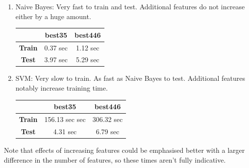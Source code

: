 \documentclass[twocolumn]{article}
\begin{document}
\begin{enumerate}

    \item Naive Bayes: Very fast to train and test. Additional features do not increase either by a huge amount.
    \begin{center}
    \begin{tabular}{ |c|c|c| } 
     \hline
      & \textbf{best35} & \textbf{best446} \\ 
     \hline 
     \textbf{Train} & 0.37 sec & 1.12 sec \\ 
     \textbf{Test} & 3.97 sec & 5.29 sec \\ 
     \hline
    \end{tabular}
    \end{center}
    
    \item SVM: Very slow to train. As fast as Naive Bayes to test. Additional features notably increase training time.

    \begin{center}
    \begin{tabular}{ |c|c|c| } 
     \hline
      & \textbf{best35} & \textbf{best446} \\ 
     \hline 
     \textbf{Train} & 156.13 sec sec & 306.32 sec \\ 
     \textbf{Test} & 4.31 sec & 6.79 sec \\ 
     \hline
    \end{tabular}
    \end{center}
    

\end{enumerate}

Note that effects of increasing features could be emphasised better with a larger difference in the number of features, so these times aren't fully indicative.
\end{document}
